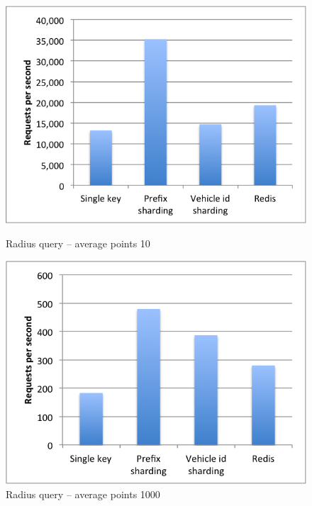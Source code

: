 \documentclass[times, utf8, diplomski]{fer}
\begin{document}
\begin{figure}[h]
\includegraphics[width=\textwidth]{radius_small}
\caption{Radius query -- average points 10}
\label{small_radius}
\endminipage\hfill
{}
\includegraphics[width=\textwidth]{radius_big}
\caption{Radius query -- average points 1000}
\label{big_radius}
\endminipage\hfill
\end{figure}
\end{document}
